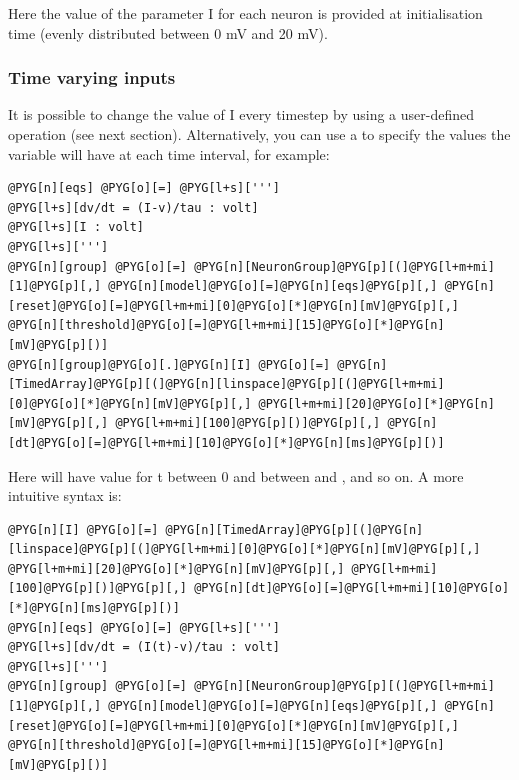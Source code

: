 \documentclass[letterpaper,10pt,english]{manual}
\begin{document}
Here the value of the parameter I for each neuron is provided at initialisation time
(evenly distributed between 0 mV and 20 mV).


\subsubsection{Time varying inputs}

It is possible to change the value of I every timestep by using a user-defined operation (see next
section). Alternatively, you can use a \hyperlink{brian.TimedArray}{} to specify the values the variable will
have at each time interval, for example:

\begin{Verbatim}[commandchars=@\[\]]
@PYG[n][eqs] @PYG[o][=] @PYG[l+s][''']
@PYG[l+s][dv/dt = (I-v)/tau : volt]
@PYG[l+s][I : volt]
@PYG[l+s][''']
@PYG[n][group] @PYG[o][=] @PYG[n][NeuronGroup]@PYG[p][(]@PYG[l+m+mi][1]@PYG[p][,] @PYG[n][model]@PYG[o][=]@PYG[n][eqs]@PYG[p][,] @PYG[n][reset]@PYG[o][=]@PYG[l+m+mi][0]@PYG[o][*]@PYG[n][mV]@PYG[p][,] @PYG[n][threshold]@PYG[o][=]@PYG[l+m+mi][15]@PYG[o][*]@PYG[n][mV]@PYG[p][)]
@PYG[n][group]@PYG[o][.]@PYG[n][I] @PYG[o][=] @PYG[n][TimedArray]@PYG[p][(]@PYG[n][linspace]@PYG[p][(]@PYG[l+m+mi][0]@PYG[o][*]@PYG[n][mV]@PYG[p][,] @PYG[l+m+mi][20]@PYG[o][*]@PYG[n][mV]@PYG[p][,] @PYG[l+m+mi][100]@PYG[p][)]@PYG[p][,] @PYG[n][dt]@PYG[o][=]@PYG[l+m+mi][10]@PYG[o][*]@PYG[n][ms]@PYG[p][)]
\end{Verbatim}

Here  will have value  for t between 0 and  between  and
, and so on. A more intuitive syntax is:

\begin{Verbatim}[commandchars=@\[\]]
@PYG[n][I] @PYG[o][=] @PYG[n][TimedArray]@PYG[p][(]@PYG[n][linspace]@PYG[p][(]@PYG[l+m+mi][0]@PYG[o][*]@PYG[n][mV]@PYG[p][,] @PYG[l+m+mi][20]@PYG[o][*]@PYG[n][mV]@PYG[p][,] @PYG[l+m+mi][100]@PYG[p][)]@PYG[p][,] @PYG[n][dt]@PYG[o][=]@PYG[l+m+mi][10]@PYG[o][*]@PYG[n][ms]@PYG[p][)]
@PYG[n][eqs] @PYG[o][=] @PYG[l+s][''']
@PYG[l+s][dv/dt = (I(t)-v)/tau : volt]
@PYG[l+s][''']
@PYG[n][group] @PYG[o][=] @PYG[n][NeuronGroup]@PYG[p][(]@PYG[l+m+mi][1]@PYG[p][,] @PYG[n][model]@PYG[o][=]@PYG[n][eqs]@PYG[p][,] @PYG[n][reset]@PYG[o][=]@PYG[l+m+mi][0]@PYG[o][*]@PYG[n][mV]@PYG[p][,] @PYG[n][threshold]@PYG[o][=]@PYG[l+m+mi][15]@PYG[o][*]@PYG[n][mV]@PYG[p][)]
\end{Verbatim}
\end{document}
